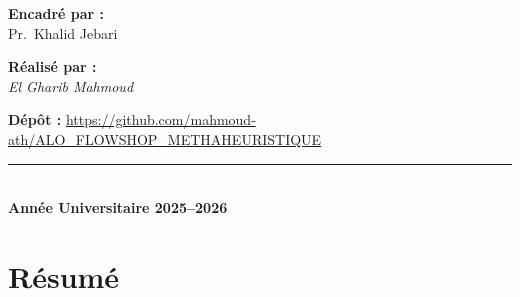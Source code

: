\documentclass[12pt,a4paper,twoside]{report}
\begin{document}
\begin{titlepage}
  \vspace{0.45cm}

  \begin{tcolorbox}[
    colback=LightGray,
    colframe=MidGray!45,
    width=\linewidth,
    arc=4pt,
    boxrule=0.6pt,
    left=12pt,
    right=12pt,
    top=8pt,
    bottom=8pt
  ]
    \noindent
    \begin{minipage}[t]{0.48\linewidth}
      \textbf{\textcolor{PrimaryRed}{Encadré par :}}\\[0.15cm]
      Pr.\ Khalid Jebari
    \end{minipage}
    \hfill
    \begin{minipage}[t]{0.48\linewidth}
      \raggedleft
      \textbf{\textcolor{PrimaryRed}{Réalisé par :}}\\[0.15cm]
      \textit{El Gharib Mahmoud}
    \end{minipage}
  \end{tcolorbox}

  \vspace{0.15cm}
  \noindent
  \textbf{\textcolor{PrimaryRed}{Dépôt :}} \href{https://github.com/mahmoud-ath/ALO_FLOWSHOP_METHAHEURISTIQUE}{https://github.com/mahmoud-ath/ALO_FLOWSHOP_METHAHEURISTIQUE}

  \vspace{0.35cm}

  \begin{center}
    \textcolor{PrimaryRed}{\rule{0.45\linewidth}{0.8pt}}\\[0.25cm]
    {\large\bfseries Année Universitaire 2025--2026}
  \end{center}
\end{titlepage}

\newpage
{}
\setcounter{page}{1}

\tableofcontents
\newpage

\listoffigures
\newpage

\listoftables
\newpage

\setcounter{page}{1}

\chapter*{Résumé}
\end{document}
